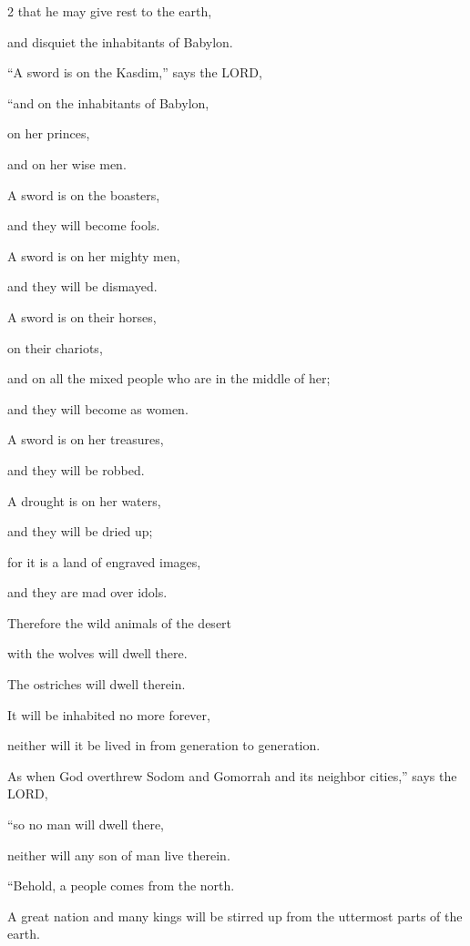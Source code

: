 \begin{multicols}{2}
that he may give rest to the earth,

and disquiet the inhabitants of Babylon.

\vspace{\baselineskip}

\myverse{}“A sword is on the Kasdim,” says the LORD,

“and on the inhabitants of Babylon,

on her princes,

and on her wise men.


\myverse{}A sword is on the boasters,

and they will become fools.

A sword is on her mighty men,

and they will be dismayed.


\myverse{}A sword is on their horses,

on their chariots,

and on all the mixed people who are in the middle of her;

and they will become as women.

A sword is on her treasures,

and they will be robbed.


\myverse{}A drought is on her waters,

and they will be dried up;

for it is a land of engraved images,

and they are mad over idols.


\myverse{}Therefore the wild animals of the desert

with the wolves will dwell there.

The ostriches will dwell therein.

It will be inhabited no more forever,

neither will it be lived in from generation to generation.


\myverse{}As when God overthrew Sodom and Gomorrah and its neighbor cities,”
says the LORD,

“so no man will dwell there,

neither will any son of man live therein.

\vspace{\baselineskip}

\myverse{}“Behold, a people comes from the north.

A great nation and many kings will be stirred up from the uttermost parts of the
earth.



\end{multicols}
